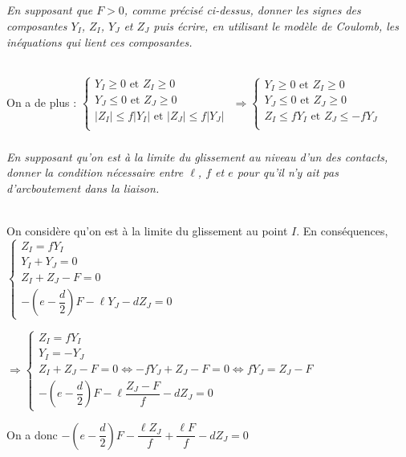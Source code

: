 \documentclass[10pt,fleqn]{article} %
\begin{document}
\begin{multicols}{2}
\subparagraph{}\textit{En supposant que $F > 0$, comme précisé ci-dessus, donner  les signes des composantes  $Y_I$, $Z_I$, $Y_J$ et $Z_J$ puis écrire,  en utilisant  le modèle  de Coulomb, les inéquations  qui lient ces composantes.}
\ifprof
\begin{corrige} ~\\
On a de plus : 
$
\left\{
\begin{array}{l}
Y_I \geq 0 \text{ et } Z_I \geq 0 \\
Y_J \leq 0 \text{ et } Z_J \geq 0 \\
|Z_I|\leq f|Y_I| \text{ et }  |Z_J|\leq f|Y_J| \\
\end{array}
\right.$
$ \Rightarrow 
\left\{
\begin{array}{l}
Y_I \geq 0 \text{ et } Z_I \geq 0 \\
Y_J \leq 0 \text{ et } Z_J \geq 0 \\
Z_I\leq fY_I \text{ et }  Z_J\leq -fY_J \\
\end{array}
\right.$


\end{corrige}
\else
\fi

\subparagraph{}\textit{En supposant qu’on est à  la limite du glissement au niveau d’un des contacts, donner la condition nécessaire entre $\ell$, $f$ et $e$ pour qu’il n’y ait pas d’arcboutement dans la liaison.}
\ifprof
\begin{corrige}~\\

On considère qu'on est à la limite du glissement au point $I$.  En conséquences, 
$
\left\{
\begin{array}{l}
Z_I =  fY_I  \\
Y_I + Y_J = 0 \\
Z_I + Z_J -F = 0 \\ 
-\left(e-\dfrac{d}{2}\right)F -\ell Y_J -d Z_J = 0
\end{array}
\right.$

$\Rightarrow
\left\{
\begin{array}{l}
Z_I =  fY_I  \\
Y_I =- Y_J \\
Z_I + Z_J -F = 0 \Leftrightarrow  - f Y_J + Z_J -F = 0\Leftrightarrow  f Y_J =  Z_J -F  \\ 
-\left(e-\dfrac{d}{2}\right)F -\ell \dfrac{Z_J -F}{f}  -d Z_J = 0
\end{array}
\right.$

On a donc
 $-\left(e-\dfrac{d}{2}\right)F - \dfrac{\ell Z_J }{f}  + \dfrac{ \ell F}{f}   -d Z_J = 0$
 

\end{corrige}
\end{multicols}
\end{document}
